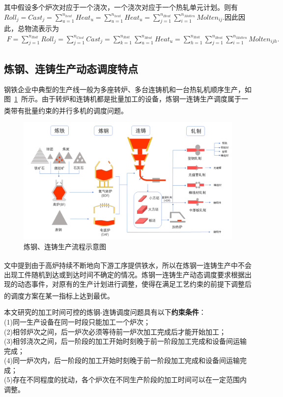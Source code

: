 \documentclass{whutmod}
\newcommand{\upcite}[1]{\textsuperscript{\cite{#1}}}
\begin{document}
其中假设多个炉次对应于一个浇次，一个浇次对应于一个热轧单元计划。则有
$Roll_j=Cast_j=\sum_{u=1}^{n_{heat}}Heat_u=\sum_{u=1}^{n_{heat}}Heat_u=\sum_{j=1}^{n_{Heat}}\sum_{i=1}^{n_{Molten}}Molten_{ij}.$因此因此，总物流表示为
\begin{gather*}
F=\sum_{j=1}^{n_{Roll}}Roll_j=\sum_{j=1}^{n_{Cast}}Cast_j=\sum_{k=1}^{n_{Roll}}\sum_{u=1}^{n_{Heat}}Heat_u=\sum_{h=1}^{n_{Roll}}\sum_{j=1}^{n_{Heat}}\sum_{i=1}^{n_{Molten}}Molten_{ijh}.
\end{gather*}

	\subsection{炼钢、连铸生产动态调度特点}

钢铁企业中典型的生产线一般为多座转炉、多台连铸机和一台热轧机顺序生产，如图~\ref{111sad1sssssss11}~所示。由于转炉和连铸机都是批量加工的设备，炼钢一连铸生产调度属于一类带有批量约束的并行多机的调度问题\upcite{2}。

	\begin{figure}[H]
	\centering
	\includegraphics[width=.8\textwidth]{figures/big.png}
	\caption{炼钢、连铸生产流程示意图}\label{111sad1sssssss11}
\end{figure}

    文\upcite{3}中提到由于高炉持续不断地向下游工序提供铁水，所以在炼钢一连铸生产中不会出现工件随机到达或到达时间不确定的情况。炼钢一连铸生产动态调度要求根据出现的动态事件，对原有的生产计划进行调整，使得在满足工艺约束的前提下调整后的调度方案在某一指标上达到最优\upcite{3}。

本文研究的加工时间可控的炼钢-连铸调度问题具有以下\textbf{约束条件}：\\
(1)同一生产设备在同一时段只能加工一个炉次；\\
(2)相邻炉次之间，后一炉次必须等待前一炉次加工完成后才能开始加工；\\
(3)相邻浇次之间，后一阶段的加工开始时刻晚于前一阶段加工完成和设备间运输完成；\\
(4)同一炉次内，后一阶段的加工开始时刻晚于前一阶段加工完成和设备间运输完成；\\
(5)存在不同程度的扰动，各个炉次在不同生产阶段的加工时间可以在一定范围内调整。
\end{document}
